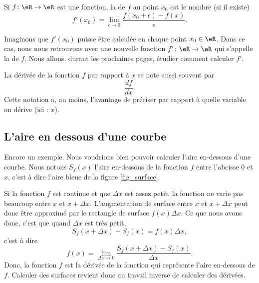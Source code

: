 \documentclass{article}
\begin{document}
\begin{definition}
Si $f\colon \eR\to \eR$ est une fonction, la  de $f$ au point $x_0$ est le nombre (si il existe)
\begin{equation}
	f'(x_0)=\lim_{\epsilon\to 0}\frac{ f(x_0+\epsilon)-f(x) }{ \epsilon }.
\end{equation}
\end{definition}
Imaginons que $f'(x_0)$ puisse être calculée en chaque point $x_0\in\eR$. Dans ce cas, nous nous retrouvons avec une nouvelle fonction $f'\colon \eR\to \eR$ qui s'appelle la  de $f$. Nous allons, durant les prochaines pages, étudier comment calculer $f'$.

La dérivée de la fonction $f$ par rapport à $x$ se note aussi souvent par
\begin{equation}
	\frac{ df }{ dx }.
\end{equation}
Cette notation a, au moins, l'avantage de préciser par rapport à quelle variable on dérive (ici : $x$).

					\subsection{L'aire en dessous d'une courbe}		\label{SubSecAirePrimInto}

Encore un exemple. Nous voudrions bien pouvoir calculer l'aire en-dessous d'une courbe. Nous notons $S_f(x)$ l'aire en-dessous de la fonction $f$ entre l'abcisse $0$ et $x$, c'est à dire l'aire bleue de la figure \ref{fig_surface}. 

Si la fonction $f$ est continue et que $\Delta x$ est assez petit, la fonction ne varie pas beaucoup entre $x$ et $x+\Delta x$. L'augmentation de surface entre $x$ et $x+\Delta x$ peut donc être approximé par le rectangle de surface $f(x)\Delta x$. Ce que nous avons donc, c'est que quand $\Delta x$ est très petit,
\begin{equation}
	S_f(x+\Delta x)-S_f(x)=f(x)\Delta x,
\end{equation}
c'est à dire
\begin{equation}
	f(x)=\lim_{\Delta x\to 0}\frac{  S_f(x+\Delta x)-S_f(x)}{ \Delta x }.
\end{equation}
Donc, la fonction $f$ est la dérivée de la fonction qui représente l'aire en-dessous de $f$. Calculer des surfaces revient donc au travail inverse de calculer des dérivées.
\end{document}
